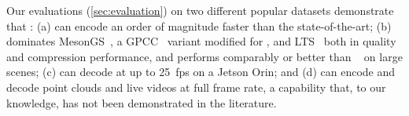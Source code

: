 Our evaluations (\cref{sec:evaluation}) on two different popular \dgs{} datasets demonstrate that \gsnfs{}: (a) can encode an order of magnitude faster than the state-of-the-art; (b) dominates MesonGS~\cite{mesongs}, a GPCC~\cite{gpcc-adaptive} variant modified for \dgs{}, and LTS~\cite{LTS} both in quality and compression performance, and performs comparably or better than \vthree{}~\cite{v3volumetric} on large scenes; (c) can decode \dgs{} at up to 25~fps on a Jetson Orin; and (d) can encode and decode point clouds and live \dgs{} videos at full frame rate, a capability that, to our knowledge, has not been demonstrated in the literature.




  
  

